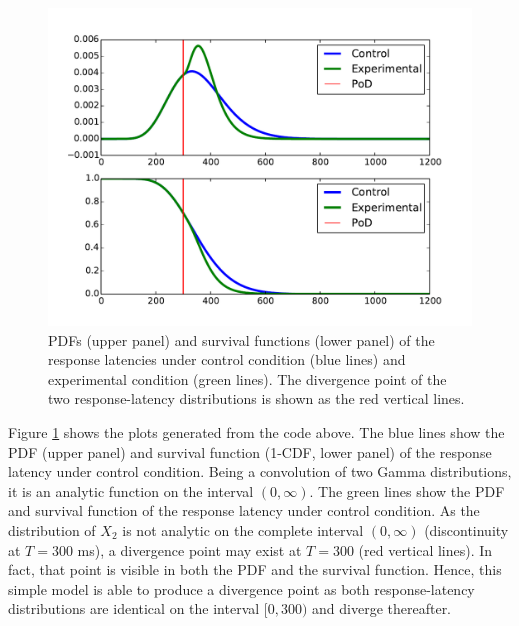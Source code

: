 \begin{figure} [!ht]
 \centering
 \includegraphics[width=.6\textwidth]{pod.pdf}
 \caption{PDFs (upper panel) and survival functions (lower panel) of the response latencies under 
 control condition (blue lines) and experimental condition (green lines).  The divergence point of 
 the two response-latency distributions is shown as the red vertical lines. \label{fig:pod}}
\end{figure}

Figure \ref{fig:pod} shows the plots generated from the code above. The blue lines show the PDF
(upper panel) and survival function (1-CDF, lower panel) of the response latency under control
condition. Being a convolution of two Gamma distributions, it is an analytic function on the
interval $(0,\infty)$. The green lines show the PDF and survival function of the response latency
under control condition. As the distribution of $X_2$ is not analytic on the complete interval
$(0,\infty)$ (discontinuity at $T=300$ ms), a divergence point may exist at $T=300$ (red vertical
lines).  In fact, that point is visible in both the PDF and the survival function. Hence, this simple
model is able to produce a divergence point as both response-latency distributions are identical
on the interval $[0,300)$ and diverge thereafter.
